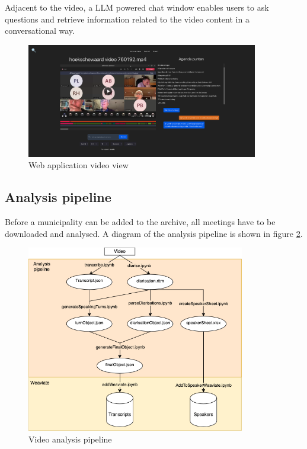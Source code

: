 \documentclass[twoside]{uva-inf-bachelor-thesis}
\begin{document}
Adjacent to the video, a LLM powered chat window enables users to ask questions and retrieve information related to the video content in a conversational way.
\begin{figure}
    \centering
    \includegraphics[width=0.9\textwidth]{images/frontend.png}
    \caption{Web application video view}
    \label{fig:frontendVid}
\end{figure}

\subsection{Analysis pipeline}
Before a municipality can be added to the archive, all meetings have to be downloaded and analysed. A diagram of the analysis pipeline is shown in figure \ref{fig:pipeline}.

\begin{figure}
    \centering
    \includegraphics[width=0.85\textwidth]{images/pipeline.png}
    \caption{Video analysis pipeline}
    \label{fig:pipeline}
\end{figure}
\end{document}
